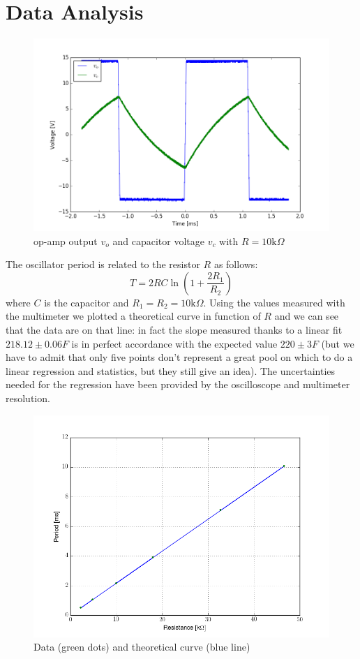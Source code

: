 \section{Data Analysis}
\begin{figure}[H]
\centering
\includegraphics[width=.7\textwidth]{5/10k_plot.png}
\caption{op-amp output $v_o$ and capacitor voltage $v_c$ with $R=10\text{k}\Omega$}
\end{figure}
The oscillator period is related to the resistor $R$ as follows:
\[T = 2RC\ln \left(1+\frac{2R_1}{R_2}\right)\]
where $C$ is the capacitor and $R_1=R_2=10\text{k}\Omega$. Using the values measured with the multimeter we plotted a theoretical curve in function of $R$ and we can see that the data are on that line: in fact the slope measured thanks to a linear fit $218.12 \pm 0.06 F$ is in perfect accordance with the expected value $220 \pm 3 F$ (but we have to admit that only five points don't represent a great pool on which to do a linear regression and statistics, but they still give an idea). The uncertainties needed for the regression have been provided by the oscilloscope and multimeter resolution. 
\begin{figure}[H]
\centering
\includegraphics[width=.7\textwidth]{5/fit.png}
\caption{Data (green dots) and theoretical curve (blue line)}
\end{figure}
